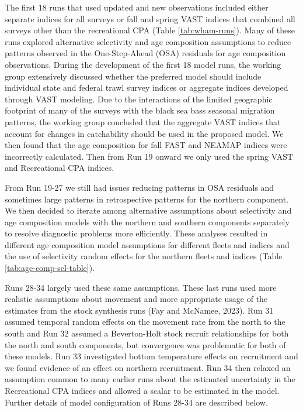 \documentclass[
]{article}
\begin{document}
The first 18 runs that used updated and new observations included either separate indices for all surveys or fall and spring VAST indices that combined all surveys other than the recreational CPA (Table \ref{tab:wham-runs}). Many of these runs explored alternative selectivity and age composition assumptions to reduce patterns observed in the One-Step-Ahead (OSA) residuals for age composition observations. During the development of the first 18 model runs, the working group extensively discussed whether the preferred model should include individual state and federal trawl survey indices or aggregate indices developed through VAST modeling. Due to the interactions of the limited geographic footprint of many of the surveys with the black sea bass seasonal migration patterns, the working group concluded that the aggregate VAST indices that account for changes in catchability should be used in the proposed model.
We then found that the age composition for fall FAST and NEAMAP indices were incorrectly calculated. Then from Run 19 onward we only used the spring VAST and Recreational CPA indices.

From Run 19-27 we still had issues reducing patterns in OSA residuals and sometimes large patterns in retrospective patterns for the northern component. We then decided to iterate among alternative assumptions about selectivity and age composition models with the northern and southern components separately to resolve diagnostic problems more efficiently. These analyses resulted in different age composition model assumptions for different fleets and indices and the use of selectivity random effects for the northern fleets and indices (Table \ref{tab:age-comp-sel-table}).

Runs 28-34 largely used these same assumptions. These last runs used more realistic assumptions about movement and more appropriate usage of the estimates from the stock synthesis runs (Fay and McNamee, 2023). Run 31 assumed temporal random effects on the movement rate from the north to the south and Run 32 assumed a Beverton-Holt stock recruit relationships for both the north and south components, but convergence was problematic for both of these models. Run 33 investigated bottom temperature effects on recruitment and we found evidence of an effect on northern recruitment. Run 34 then relaxed an assumption common to many earlier runs about the estimated uncertainty in the Recreational CPA indices and allowed a scalar to be estimated in the model. Further details of model configuration of Runs 28-34 are described below.
\end{document}
